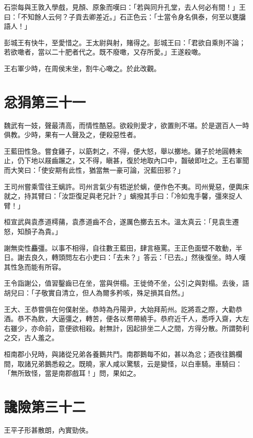 石崇每與王敦入學戲，見顏、原象而嘆曰：「若與同升孔堂，去人何必有間！」王曰：「不知餘人云何？子貢去卿差近。」石正色云：「士當令身名俱泰，何至以甕牖語人！」

彭城王有快牛，至愛惜之。王太尉與射，賭得之。彭城王曰：「君欲自乘則不論；若欲噉者，當以二十肥者代之。既不廢噉，又存所愛。」王遂殺噉。

王右軍少時，在周侯末坐，割牛心噉之。於此改觀。



\chapter{忿狷第三十一}

魏武有一妓，聲最清高，而情性酷惡。欲殺則愛才，欲置則不堪。於是選百人一時俱教。少時，果有一人聲及之，便殺惡性者。

王藍田性急。嘗食雞子，以筯刺之，不得，便大怒，舉以擲地。雞子於地圓轉未止，仍下地以屐齒蹍之，又不得，瞋甚，復於地取內口中，齧破即吐之。王右軍聞而大笑曰：「使安期有此性，猶當無一豪可論，況藍田邪？」

王司州嘗乘雪往王螭許。司州言氣少有牾逆於螭，便作色不夷。司州覺惡，便輿床就之，持其臂曰：「汝詎復足與老兄計？」螭撥其手曰：「冷如鬼手馨，彊來捉人臂！」

桓宣武與袁彥道樗蒱，袁彥道齒不合，遂厲色擲去五木。溫太真云：「見袁生遷怒，知顏子為貴。」

謝無奕性麤彊。以事不相得，自往數王藍田，肆言極罵。王正色面壁不敢動，半日。謝去良久，轉頭問左右小吏曰：「去未？」答云：「已去。」然後復坐。時人嘆其性急而能有所容。

王令詣謝公，值習鑿齒已在坐，當與併榻。王徙倚不坐，公引之與對榻。去後，語胡兒曰：「子敬實自清立，但人為爾多矜咳，殊足損其自然。」

王大、王恭嘗俱在何僕射坐。恭時為丹陽尹，大始拜荊州。訖將乖之際，大勸恭酒。恭不為飲，大逼彊之，轉苦，便各以帬帶繞手。恭府近千人，悉呼入齋，大左右雖少，亦命前，意便欲相殺。射無計，因起排坐二人之間，方得分散。所謂勢利之交，古人羞之。

桓南郡小兒時，與諸從兄弟各養鵝共鬥。南郡鵝每不如，甚以為忿；迺夜往鵝欄間，取諸兄弟鵝悉殺之。既曉，家人咸以驚駭，云是變怪，以白車騎。車騎曰：「無所致怪，當是南郡戲耳！」問，果如之。



\chapter{讒險第三十二}

王平子形甚散朗，內實勁俠。

